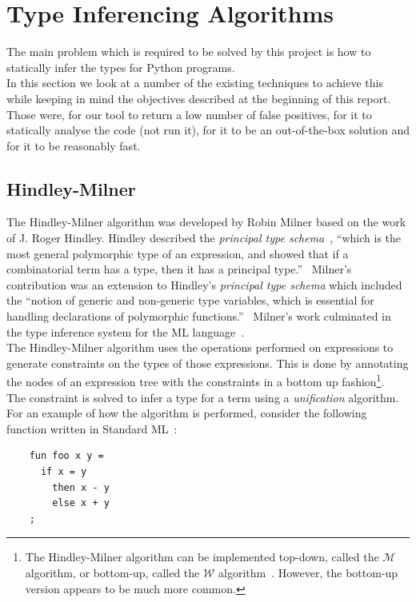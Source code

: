 \documentclass[12pt, titlepage]{article}
\begin{document}
\newpage
\section{Type Inferencing Algorithms}
\label{chap:typeinferencering}
The main problem which is required to be solved by this project is how to statically infer the types for Python programs. \\
\indent In this section we look at a number of the existing techniques to achieve this while keeping in mind the objectives described at the beginning of this report. Those were, for our tool to return a low number of false positives, for it to statically analyse the code (not run it), for it to be an out-of-the-box solution and for it to be reasonably fast.

\subsection{Hindley-Milner}
The Hindley-Milner algorithm was developed by Robin Milner based on the work of J. Roger Hindley. Hindley described the \textit{principal
type schema}~\cite{hindley69}, ``which is the most general polymorphic type of an expression, and showed that if a combinatorial term has a type, then it has a principal type.''~\cite{cardelli87} Milner's contribution was an extension to Hindley's \textit{principal type schema} which included the ``notion of generic and non-generic type variables, which is essential for handling declarations of polymorphic functions.''~\cite{cardelli87} Milner's work culminated in the type inference system for the ML language~\cite{milner84}. \\
\indent The Hindley-Milner algorithm uses the operations performed on expressions to generate constraints on the types of those expressions. This is done by annotating the nodes of an expression tree with the constraints in a bottom up fashion\footnote{The Hindley-Milner algorithm can be implemented top-down, called the $\mathcal{M}$ algorithm, or bottom-up, called the $\mathcal{W}$ algorithm~\cite{heeren02}. However, the bottom-up version appears to be much more common.}. \\ 
\indent The constraint is solved to infer a type for a term using a \textit{unification} algorithm. \\
\indent For an example of how the algorithm is performed, consider the following function written in Standard ML~\cite{cannonlocalizedtype}:
\begin{lstlisting}
    fun foo x y =
      if x = y
        then x - y
        else x + y
    ;
\end{lstlisting}
\end{document}
